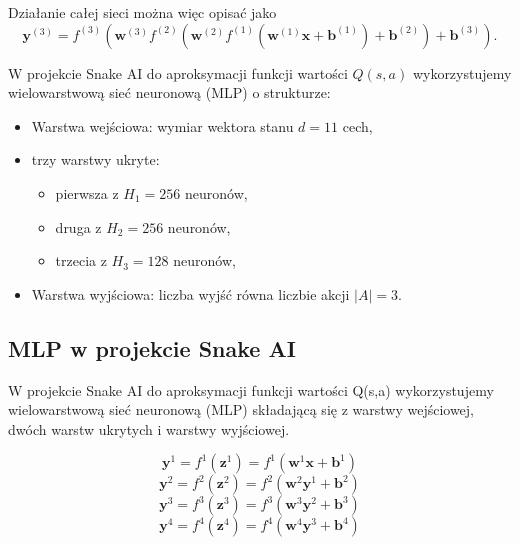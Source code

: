 \documentclass[a4paper,12pt]{article}
\begin{document}
Działanie całej sieci można więc opisać jako
\begin{equation}
\mathbf{y}^{(3)} = f^{(3)}\left( \mathbf{w}^{(3)} f^{(2)}\left( \mathbf{w}^{(2)} f^{(1)}\left( \mathbf{w}^{(1)} \mathbf{x} + \mathbf{b}^{(1)} \right) + \mathbf{b}^{(2)} \right) + \mathbf{b}^{(3)} \right).
\end{equation}

\cite{RZajdelMLP}



W projekcie Snake AI do aproksymacji funkcji wartości $Q(s,a)$ wykorzystujemy wielowarstwową sieć neuronową (MLP) o strukturze:

\begin{itemize}
\item Warstwa wejściowa: wymiar wektora stanu $d=11$ cech,
\item trzy warstwy ukryte:
\begin{itemize}
\item pierwsza z $H_1=256$ neuronów,
\item druga z $H_2=256$ neuronów,
\item trzecia z $H_3 = 128$ neuronów,
\end{itemize}
\item Warstwa wyjściowa: liczba wyjść równa liczbie akcji $|A|=3$.
\end{itemize}

\subsection{MLP w projekcie Snake AI}
W projekcie Snake AI do aproksymacji funkcji wartości Q(s,a) wykorzystujemy wielowarstwową sieć neuronową (MLP) składającą się z warstwy wejściowej, dwóch warstw ukrytych i warstwy wyjściowej. 

\begin{equation}
\mathbf{y}^{1} = f^{1}(\mathbf{z}^{1}) = f^{1}(\mathbf{w}^{1} \mathbf{x} + \mathbf{b}^{1}) 
\end{equation}
\begin{equation}
\mathbf{y}^{2} = f^{2}(\mathbf{z}^{2}) = f^{2}(\mathbf{w}^{2} \mathbf{y}^{1} + \mathbf{b}^{2}) 
\end{equation}
\begin{equation}
\mathbf{y}^{3} = f^{3}(\mathbf{z}^{3}) = f^{3}(\mathbf{w}^{3} \mathbf{y}^{2} + \mathbf{b}^{3}) 
\end{equation}
\begin{equation}
\mathbf{y}^{4} = f^{4}(\mathbf{z}^{4}) = f^{4}(\mathbf{w}^{4} \mathbf{y}^{3} + \mathbf{b}^{4})
\end{equation}
\end{document}
